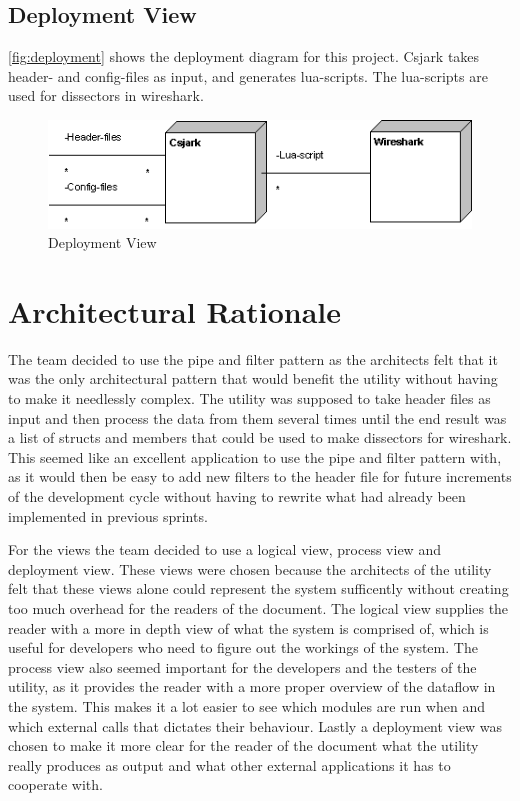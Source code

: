 \subsection{Deployment View}
\autoref{fig:deployment} shows the deployment diagram for this project. Csjark takes \gls{header}- and config-files as input, and generates \Gls{lua}-\glspl{script}. The \Gls{lua}-\glspl{script} are used for \glspl{dissector} in \Gls{wireshark}.

\begin{figure}[htb]
	\includegraphics[width = \textwidth]{./planning/img/Deployment}
	\caption{Deployment View\label{fig:deployment}}
\end{figure}


\section{Architectural Rationale}
The team decided to use the pipe and filter pattern as the architects felt that it was the only architectural pattern that would benefit the \gls{utility} without having to make it needlessly complex. The \gls{utility} was supposed to take \gls{header} files as input and then process the data from them several times until the end result was a list of \glspl{struct} and \glspl{member} that could be used to make \glspl{dissector} for \Gls{wireshark}. This seemed like an excellent application to use the pipe and filter pattern with, as it would then be easy to add new filters to the \gls{header} file for future increments of the development cycle without having to rewrite what had already been implemented in previous sprints.

For the views the team decided to use a logical view, process view and deployment view. These views were chosen because the architects of the \gls{utility} felt that these views alone could represent the system sufficently without creating too much overhead for the readers of the document. The logical view supplies the reader with a more in depth view of what the system is comprised of, which is useful for developers who need to figure out the workings of the system. The process view also seemed important for the developers and the testers of the \gls{utility}, as it provides the reader with a more proper overview of the dataflow in the system. This makes it a lot easier to see which modules are run when and which external calls that dictates their behaviour. Lastly a deployment view was chosen to make it more clear for the reader of the document what the \gls{utility} really produces as output and what other external applications it has to cooperate with. 

